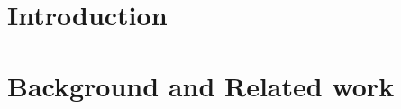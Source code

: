 \documentclass[11pt, nofrench]{thesul}
\theoremstyle{definition}
\begin{document}




\WritePartLabelInToc
\WriteChapterLabelInToc




% 


\tableofcontents
\mainmatter








\chapter*{Introduction}\label{chap:intro}



\chapter{Background and Related work}\label{chap:related_work}

\end{document}
